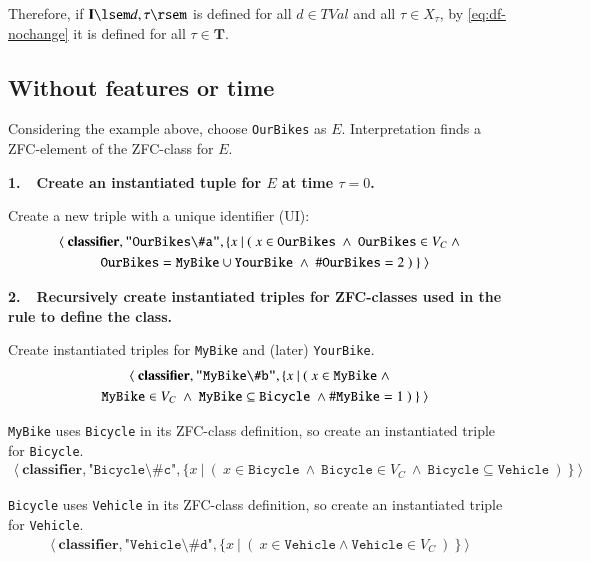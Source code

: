 Therefore, if $\mathbf{I}\lsem d,\tau\rsem$ is defined for all $d\in \mathit{TVal}$ and all $\tau\in X_\tau$, by \ref{eq:df-nochange} it is defined for all $\tau\in\mathbf{T}$.


\subsection{Without features or time}

Considering the example above, choose \texttt{OurBikes} as $E$.  
Interpretation finds a ZFC-element of the ZFC-class for $E$.

\textbf{1.~~Create an instantiated tuple for $E$ at time $\tau=0$.}

Create a new triple with a unique identifier (UI):
\begin{gather}
\langle~\textbf{classifier},\texttt{"OurBikes\textbackslash\#a"}, \{x~\vert ~(~ x \in \texttt{OurBikes}~\wedge~\texttt{OurBikes}\in V_C~ \wedge \notag \\
 ~~~  \texttt{OurBikes}=\texttt{MyBike}\cup\texttt{YourBike}~\wedge~\#\texttt{OurBikes}=2~)~\}~\rangle
\end{gather}

\textbf{2.~~Recursively create instantiated triples for ZFC-classes used in the rule to define the class.}

Create instantiated triples for \texttt{MyBike} and (later) \texttt{YourBike}.
\begin{gather}
\langle~\textbf{classifier},\texttt{"MyBike\textbackslash\#b"},\{x~\vert ~(~ x \in \texttt{MyBike}~ \wedge \notag \\
 ~~~\texttt{MyBike}\in V_C~\wedge~ \texttt{MyBike}\subseteq\texttt{Bicycle}~\wedge \#\texttt{MyBike}=1~)~\}~\rangle
\end{gather}

\texttt{MyBike} uses \texttt{Bicycle} in its ZFC-class definition, so create an instantiated triple for \texttt{Bicycle}.
\begin{gather}
\langle~\textbf{classifier},\texttt{"Bicycle\textbackslash\#c"},\{x~\vert ~(~ x \in \texttt{Bicycle} ~\wedge~ \texttt{Bicycle}\in V_C~\wedge~ \texttt{Bicycle}\subseteq\texttt{Vehicle}~)~\}~\rangle
\end{gather}

\texttt{Bicycle} uses \texttt{Vehicle} in its ZFC-class definition, so create an instantiated triple for \texttt{Vehicle}.
\begin{gather}
\langle~\textbf{classifier},\texttt{"Vehicle\textbackslash\#d"},\{x~\vert ~(~ x \in \texttt{Vehicle} \wedge \texttt{Vehicle}\in V_C~)~\}~\rangle
\end{gather}


